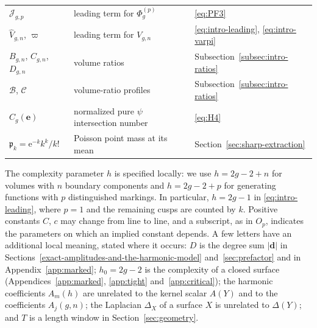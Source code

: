 {\begin{longtable}{@{}lll@{}}
$\mathcal J_{g,p}$ & leading term for $\Phi_g^{(p)}$ & \eqref{eq:PF3}\\
$\widehat V_{g,n}$, $\varpi$ & leading term for $V_{g,n}$ & \eqref{eq:intro-leading}, \eqref{eq:intro-varpi}\\
$B_{g,n}$, $C_{g,n}$, $D_{g,n}$ & volume ratios & Subsection~\ref{subsec:intro-ratios}\\
$\mathcal B$, $\mathcal C$ & volume-ratio profiles & Subsection~\ref{subsec:intro-ratios}\\
$C_g(\mathbf e)$ & normalized pure $\psi$ intersection number & \eqref{eq:H4}\\
$\mathfrak p_k=\mathrm e^{-k}k^k/k!$ & Poisson point mass at its mean & Section~\ref{sec:sharp-extraction}\\
\hline
\end{longtable}}

The complexity parameter $h$ is specified locally: we use $h=2g-2+n$ for volumes with $n$ boundary components and $h=2g-2+p$ for generating functions with $p$ distinguished markings. In particular, $h=2g-1$ in \eqref{eq:intro-leading}, where $p=1$ and the remaining cusps are counted by $k$. Positive constants $C$, $c$ may change from line to line, and a subscript, as in $O_p$, indicates the parameters on which an implied constant depends. A few letters have an additional local meaning, stated where it occurs: $D$ is the degree sum $|\mathbf d|$ in Sections~\ref{exact-amplitudes-and-the-harmonic-model} and~\ref{sec:prefactor} and in Appendix~\ref{app:marked}; $h_0=2g-2$ is the complexity of a closed surface (Appendices~\ref{app:marked}, \ref{app:tight} and~\ref{app:critical}); the harmonic coefficients $A_m(h)$ are unrelated to the kernel scalar $A(Y)$ and to the coefficients $A_j(g,n)$; the Laplacian $\Delta_X$ of a surface $X$ is unrelated to $\Delta(Y)$; and $T$ is a length window in Section~\ref{sec:geometry}.
